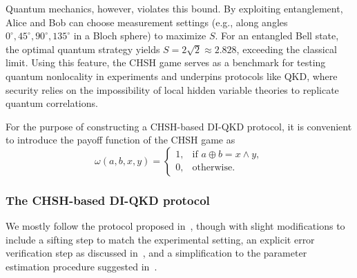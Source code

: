 \documentclass[aps,reprint,showpacs,superscriptaddress]{revtex4-2}
\begin{document}
Quantum mechanics, however, violates this bound. By exploiting entanglement, Alice and Bob can choose measurement settings (e.g., along angles $0^{\circ},45^{\circ},90^{\circ},135^{\circ}$ in a Bloch sphere) to maximize $S$. For an entangled Bell state, the optimal quantum strategy yields $S=2\sqrt{2}\approx2.828$, exceeding the classical limit. Using this feature, the CHSH game serves as a benchmark for testing quantum nonlocality in experiments and underpins protocols like QKD, where security relies on the impossibility of local hidden variable theories to replicate quantum correlations.

For the purpose of constructing a CHSH-based DI-QKD protocol, it is convenient to introduce the payoff function of the CHSH game as
\begin{equation}
\omega(a,b,x,y)=\begin{cases}
1, & \text{if }a\oplus b=x\land y,\\
0, & \text{otherwise}.
\end{cases}
\end{equation}

\subsubsection{The CHSH-based DI-QKD protocol}
We mostly follow the protocol proposed in~\cite{arnon2018practical}, though with slight modifications to include a sifting step to match the experimental setting, an explicit error verification step as discussed in~\cite{TSB+22}, and a simplification to the parameter estimation procedure suggested in~\cite{arq2024generalized}.
\end{document}
